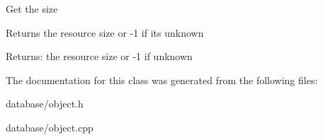 Get the size

Returns the resource size or -1 if its unknown

\begin{Desc}
\item[Returns:]the resource size or -1 if unknown \end{Desc}


The documentation for this class was generated from the following files:\begin{CompactItemize}
\item 
database/object.h\item 
database/object.cpp\end{CompactItemize}
